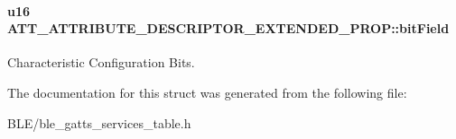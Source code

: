 \paragraph[{\texorpdfstring{bit\+Field}{bitField}}]{\setlength{\rightskip}{0pt plus 5cm}u16 A\+T\+T\+\_\+\+A\+T\+T\+R\+I\+B\+U\+T\+E\+\_\+\+D\+E\+S\+C\+R\+I\+P\+T\+O\+R\+\_\+\+E\+X\+T\+E\+N\+D\+E\+D\+\_\+\+P\+R\+O\+P\+::bit\+Field}\hypertarget{struct_a_t_t___a_t_t_r_i_b_u_t_e___d_e_s_c_r_i_p_t_o_r___e_x_t_e_n_d_e_d___p_r_o_p_afafd29fcd62a24cad0ff922b4343e726}{}\label{struct_a_t_t___a_t_t_r_i_b_u_t_e___d_e_s_c_r_i_p_t_o_r___e_x_t_e_n_d_e_d___p_r_o_p_afafd29fcd62a24cad0ff922b4343e726}
Characteristic Configuration Bits. 

The documentation for this struct was generated from the following file\+:\begin{DoxyCompactItemize}
\item 
B\+L\+E/ble\+\_\+gatts\+\_\+services\+\_\+table.\+h\end{DoxyCompactItemize}
